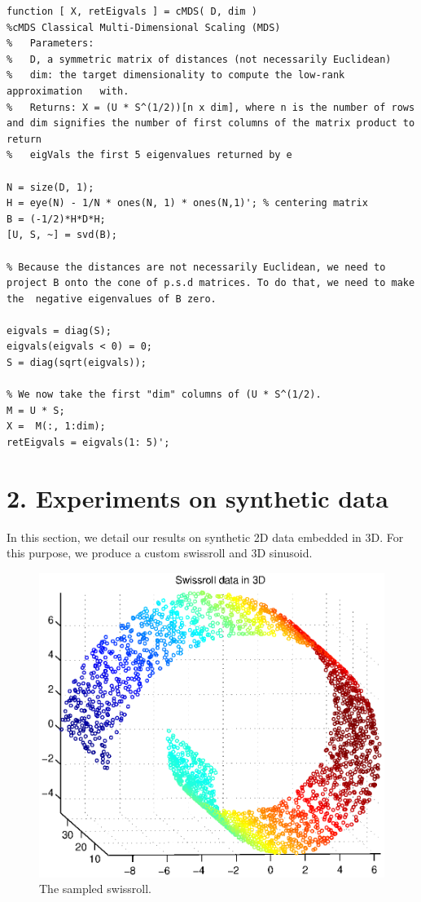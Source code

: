 \documentclass[a4paper,12pt]{report}
\begin{document}
\vspace{.2in}
\begin{lstlisting}
function [ X, retEigvals ] = cMDS( D, dim )
%cMDS Classical Multi-Dimensional Scaling (MDS)
%   Parameters: 
%   D, a symmetric matrix of distances (not necessarily Euclidean)
%   dim: the target dimensionality to compute the low-rank approximation   with.
%   Returns: X = (U * S^(1/2))[n x dim], where n is the number of rows  and dim signifies the number of first columns of the matrix product to return 
%   eigVals the first 5 eigenvalues returned by e

N = size(D, 1);
H = eye(N) - 1/N * ones(N, 1) * ones(N,1)'; % centering matrix
B = (-1/2)*H*D*H;
[U, S, ~] = svd(B);

% Because the distances are not necessarily Euclidean, we need to project B onto the cone of p.s.d matrices. To do that, we need to make the  negative eigenvalues of B zero.

eigvals = diag(S);
eigvals(eigvals < 0) = 0;
S = diag(sqrt(eigvals));

% We now take the first "dim" columns of (U * S^(1/2).
M = U * S; 
X =  M(:, 1:dim);
retEigvals = eigvals(1: 5)';
\end{lstlisting}

\section*{2. Experiments on synthetic data}

In this section, we detail our results on synthetic 2D data embedded in 3D. For this purpose, we produce a custom swissroll and 3D sinusoid. 

\begin{figure}
\centering
\includegraphics[width=.7\textwidth]{figures/swissroll_data.eps}
\caption{The sampled swissroll.}
\label{fig:swissroll}
\end{figure}
\end{document}
